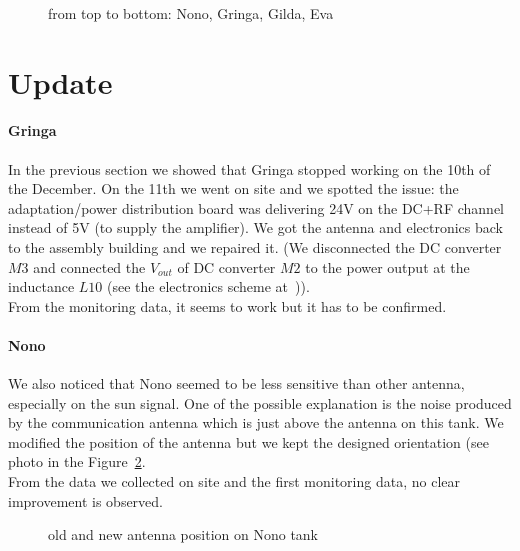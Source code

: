 \begin{figure}[ht!]
  \centering
  \hspace*{-3ex}
  \\
  \\
  \\
  \caption{from top to bottom: Nono, Gringa, Gilda, Eva}
  \label{fig:monit}
\end{figure}
\clearpage
\section{Update}
\label{sec:update}
\paragraph{Gringa}
In the previous section we showed that Gringa stopped working on the
10th of the December.  On the 11th we went on site and we spotted the
issue: the adaptation/power distribution board was delivering 24V on
the DC+RF channel instead of 5V (to supply the amplifier).  We got the
antenna and electronics back to the assembly building and we repaired
it.  (We disconnected the DC converter $M3$ and connected the
$V_{out}$ of DC converter $M2$ to the power output at the inductance
$L10$ (see the electronics scheme at~\cite{schemaelec})).\\ From the
monitoring data, it seems to work but it has to be confirmed.
\paragraph{Nono}
We  also noticed  that Nono  seemed to  be less  sensitive  than other
antenna, especially on the sun signal. One of the possible explanation
is the noise produced by the communication antenna which is just above
the antenna on this tank. We  modified the position of the antenna but
we    kept   the    designed   orientation    (see   photo    in   the
Figure~\ref{fig:newnono}. \\From the data we collected on site and the
first monitoring data, no clear improvement is observed.
\begin{figure}[ht!]
  \centering
  \hspace*{-3ex}
  \caption{old and new antenna position on Nono tank}
  \label{fig:newnono}
\end{figure}



